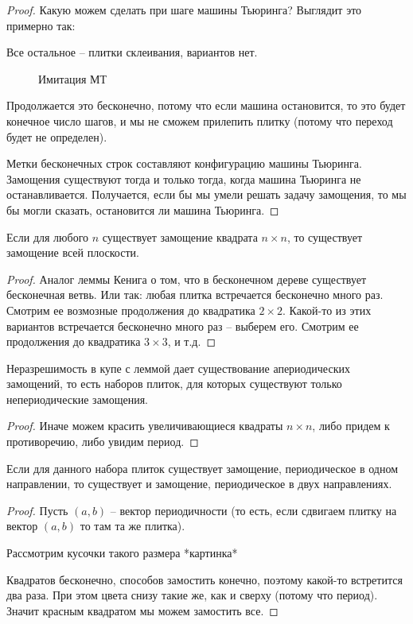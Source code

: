 \begin{proof}
    Какую можем сделать при шаге машины Тьюринга? Выглядит это примерно так:
\begin{figure}[ht]
    \centering
    \label{fig:step-mt}
\end{figure}

    Все остальное -- плитки склеивания, вариантов нет.

\begin{figure}[ht]
    \centering
    \caption{Имитация МТ}
    \label{fig:imitaion-mt}
\end{figure}

    Продолжается это бесконечно, потому что если машина остановится, то это будет конечное число
    шагов, и мы не сможем прилепить плитку (потому что переход будет не определен).

    Метки бесконечных строк составляют конфигурацию машины Тьюринга. Замощения существуют тогда и только тогда, когда машина Тьюринга не останавливается. Получается, если бы мы умели решать задачу замощения, то мы бы могли сказать, остановится ли машина Тьюринга.
\end{proof}

\begin{lm}
    Если для любого $ n $ существует замощение квадрата $ n \times n $, то существует замощение всей плоскости.
\end{lm}
\begin{proof}
    Аналог леммы Кенига о том, что в бесконечном дереве существует бесконечная ветвь. Или так: любая плитка встречается бесконечно много раз. Смотрим ее возмозные продолжения до квадратика $ 2 \times 2 $. Какой-то из этих вариантов встречается бесконечно много раз -- выберем его. Смотрим ее продолжения до квадратика $ 3 \times 3 $, и т.д.
\end{proof}

\begin{cor}
    Неразрешимость в купе с леммой дает существование апериодических замощений, то есть наборов плиток, для которых существуют только непериодические замощения.
\end{cor}
\begin{proof}
    Иначе можем красить увеличивающиеся квадраты $ n \times n $, либо придем к противоречию,
    либо увидим период.
\end{proof}

\begin{lm}
    Если для данного набора плиток существует замощение, периодическое в одном направлении, то существует и замощение, периодическое в двух направлениях.
\end{lm}
\begin{proof}
    Пусть $(a, b)$ -- вектор периодичности (то есть, если сдвигаем плитку на вектор $ (a, b) $ то там та же плитка).

    Рассмотрим кусочки такого размера *картинка*

    Квадратов бесконечно, способов замостить конечно, поэтому какой-то встретится два раза. При этом цвета снизу такие же,
    как и сверху (потому что период).
    Значит красным квадратом мы можем замостить все.
\end{proof}

